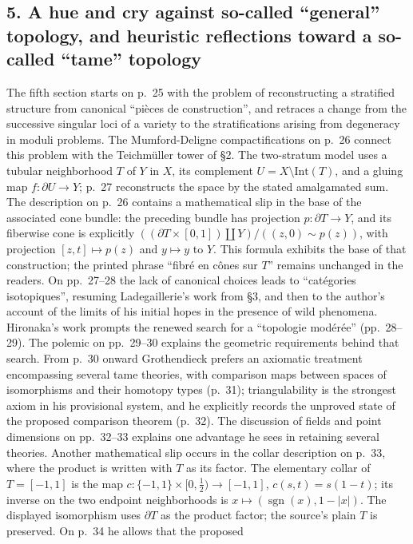 \documentclass[11pt,a4paper]{article}
\begin{document}
\subsection*{5. A hue and cry against so-called ``general'' topology, and heuristic reflections toward a so-called ``tame'' topology}
The fifth section starts on p.~25 with the problem of reconstructing a
stratified structure from canonical ``pièces de construction'', and
retraces a change from the successive singular loci of a variety to the
stratifications arising from degeneracy in moduli problems. The
Mumford-Deligne compactifications on p.~26 connect this problem with the
Teichmüller tower of \S2. The two-stratum model uses a tubular neighborhood
$T$ of $Y$ in $X$, its complement $U=X\setminus\mathrm{Int}(T)$, and a
gluing map $f:\partial U\longrightarrow Y$; p.~27 reconstructs the space
by the stated amalgamated sum. The description on p.~26 contains a
mathematical slip in the base of the associated cone bundle: the preceding
bundle has projection $p:\partial T\longrightarrow Y$, and its fiberwise
cone is explicitly
$((\partial T\times[0,1])\amalg Y)/((z,0)\sim p(z))$,
with projection $[z,t]\mapsto p(z)$ and $y\mapsto y$ to $Y$.
This formula exhibits the base of that construction; the printed phrase
``fibré en cônes sur $T$'' remains unchanged in the readers. On pp.~27--28
the lack of canonical choices leads to ``catégories isotopiques'',
resuming Ladegaillerie's work from \S3, and then to the author's account
of the limits of his initial hopes in the presence of wild phenomena.
Hironaka's work prompts the renewed search for a ``topologie modérée''
(pp.~28--29). The polemic on pp.~29--30 explains the geometric
requirements behind that search. From p.~30 onward Grothendieck prefers
an axiomatic treatment encompassing several tame theories, with
comparison maps between spaces of isomorphisms and their homotopy types
(p.~31); triangulability is the strongest axiom in his provisional system,
and he explicitly records the unproved state of the proposed comparison
theorem (p.~32). The discussion of fields and point dimensions on
pp.~32--33 explains one advantage he sees in retaining several theories.
Another mathematical slip occurs in the collar description on p.~33,
where the product is written with $T$ as its factor. The elementary collar
of $T=[-1,1]$ is the map
$c:\{-1,1\}\times[0,\tfrac12)\longrightarrow[-1,1]$,
$c(s,t)=s(1-t)$; its inverse on the two endpoint
neighborhoods is $x\mapsto(\operatorname{sgn}(x),1-|x|)$.
The displayed isomorphism uses $\partial T$ as the product factor;
the source's plain $T$ is preserved. On p.~34 he allows that the proposed
\end{document}
